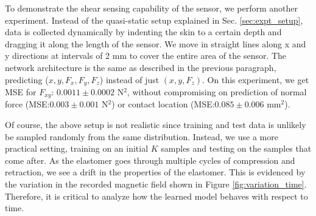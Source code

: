 \documentclass{article}
\begin{document}
To demonstrate the shear sensing capability of the sensor, we perform another experiment. Instead of the quasi-static setup explained in Sec. \ref{sec:expt_setup}, data is collected dynamically by indenting the skin to a certain depth and dragging it along the length of the sensor. We move in straight lines along x and y directions at intervals of 2 mm to cover the entire area of the sensor. The network architecture is the same as described in the previous paragraph, predicting ($x,y,F_x,F_y,F_z$) instead of just $(x,y,F_z)$. On this experiment, we get MSE for $F_{xy}$: $0.0011 \pm 0.0002$ N$^2$, without compromising on prediction of normal force (MSE:$0.003 \pm 0.001$ N$^2$) or contact location (MSE:$0.085 \pm 0.006$ mm$^2$).

Of course, the above setup is not realistic since training and test data is unlikely be sampled randomly from the same distribution. Instead, we use a more practical setting, training on an initial $K$ samples and testing on the samples that come after. As the elastomer goes through multiple cycles of compression and retraction, we see a drift in the properties of the elastomer. This is evidenced by the variation in the recorded magnetic field shown in Figure \ref{fig:variation_time}. Therefore, it is critical to analyze how the learned model behaves with respect to time.
\end{document}
